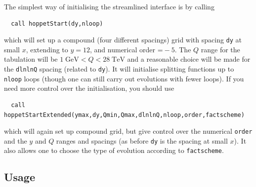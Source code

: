 \documentclass[12pt]{article}
\newcommand{\GeV}{\;\mathrm{GeV}}
\newcommand{\TeV}{\;\mathrm{TeV}}
\newcommand{\ttt}[1]{\texttt{#1}}
\begin{document}
The simplest way of initialising the 
streamlined interface is by calling
\begin{lstlisting}
  call hoppetStart(dy,nloop)
\end{lstlisting}
which will set up a compound (four different spacings) grid with
spacing \ttt{dy} at small $x$, extending to $y = 12$, and numerical
order $\ttt=-5$.  The $Q$ range for the tabulation will be $1\GeV <
Q<28 \TeV$ and a reasonable choice will be made for the \ttt{dlnlnQ}
spacing (related to \ttt{dy}). It will initialise splitting functions
up to \ttt{nloop} loops (though one can still carry out evolutions
with fewer loops).
%
If you need more control over the initialisation, you should use
\begin{lstlisting}
  call hoppetStartExtended(ymax,dy,Qmin,Qmax,dlnlnQ,nloop,order,factscheme)
\end{lstlisting}
which will again set up compound grid, but give control over the
numerical \ttt{order} and the $y$ and $Q$ ranges and spacings (as
before \ttt{dy} is the spacing at small $x$). It also allows one to
choose the type of evolution according to \ttt{factscheme}.


\subsection{Usage}
\label{sec:vanilla_usage}
\end{document}
